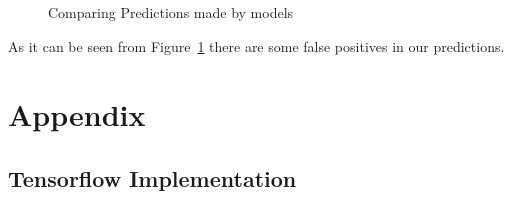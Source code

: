 \documentclass[11pt]{article}
\begin{document}
	\begin{figure}[H]
		\centering
		\hspace{0.3cm}
		\caption{Comparing Predictions made by models}
		\label{fig:Results_Comparison}
	\end{figure}

	As it can be seen from Figure~\ref{fig:Results_Comparison} there are some false
	positives in our predictions.

	\section[appendix]{Appendix}%
	\label{sec:Appendix}

	\subsection{Tensorflow Implementation}%
	\label{sub:Tensorflow Implementation}
\end{document}
